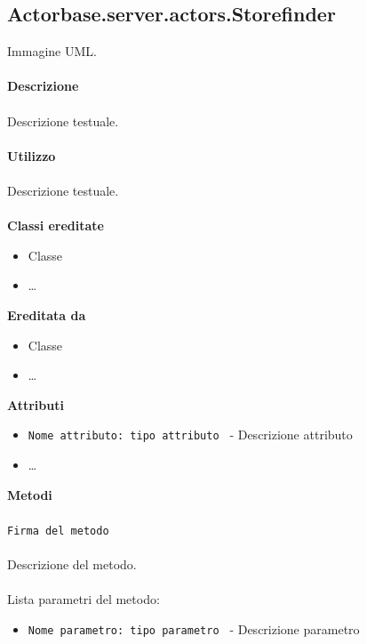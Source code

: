 \documentclass[a4paper]{article}
\begin{document}
	\subsection{Actorbase.server.actors.Storefinder}
		Immagine UML.
		\\ \\
		\textbf{Descrizione}
			\\ \\
			Descrizione testuale.
			\\ \\
		\textbf{Utilizzo}
			\\ \\
			Descrizione testuale.
			\\ \\
		\textbf{Classi ereditate}
			\begin{itemize}
				\item Classe
				\item \dots
			\end{itemize}
		\textbf{Ereditata da}
			\begin{itemize}
				\item Classe
				\item \dots
			\end{itemize}
		\textbf{Attributi}
			\begin{itemize}
				\item \texttt{Nome attributo: tipo attributo } - Descrizione attributo
				\item \dots
			\end{itemize}
		\textbf{Metodi}
			\\ \\
			\texttt{Firma del metodo}
			\\ \\
			Descrizione del metodo.
			\\ \\
			Lista parametri del metodo:
			\begin{itemize}
				\item \texttt{Nome parametro: tipo parametro } - Descrizione parametro
			\end{itemize}
			
\end{document}
